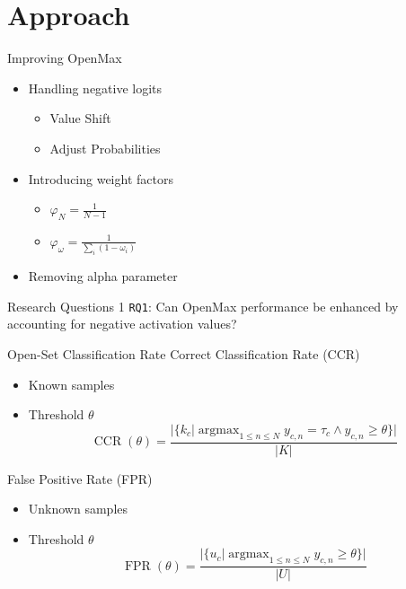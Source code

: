 \section{Approach}
\begin{frame}{Improving OpenMax}
	\begin{itemize}
		\item Handling negative logits
		      \begin{itemize}
			      \item Value Shift
			      \item Adjust Probabilities
		      \end{itemize}
		\item Introducing weight factors
		      \begin{itemize}
			      \item $ \varphi_N = \frac{1}{N-1}$
			      \item $ \varphi_{\omega} = \frac{1}{\sum_i (1 - \omega_i)}$
		      \end{itemize}
		\item Removing alpha parameter
	\end{itemize}
\end{frame}

\begin{frame}{Research Questions 1}
	\texttt{RQ1}: Can OpenMax performance be enhanced by accounting for negative activation values?
\end{frame}

\begin{frame}{Open-Set Classification Rate}
	Correct Classification Rate (CCR)
	\begin{itemize}
		\item Known samples
		\item Threshold $\theta$
		      \begin{equation}
			      \operatorname{CCR} (\theta) = \frac{| \{ k_{c} | \operatorname{argmax}_{1 \leq n \leq N} y_{c,n} = \tau_{c} \wedge y_{c,n} \geq \theta \}|}{ |K|}
		      \end{equation}
	\end{itemize}
	False Positive Rate (FPR)
	\begin{itemize}
		\item Unknown samples
		\item Threshold $\theta$
		      \begin{equation}
			      \operatorname{FPR}(\theta) = \frac{| \{ u_{c} | \operatorname{argmax}_{1 \leq n \leq N} y_{c,n} \geq \theta \}|}{ |U|}
		      \end{equation}
	\end{itemize}
\end{frame}

